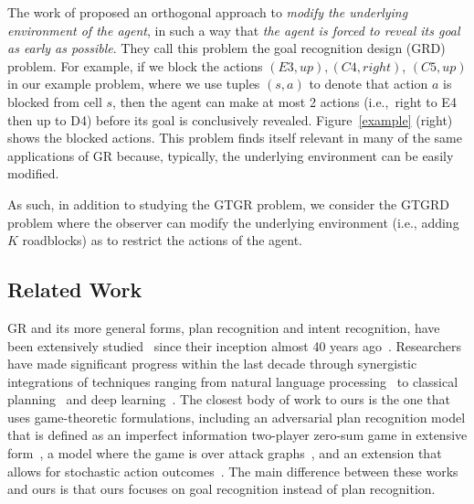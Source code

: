 The work of \cite{keren:14,keren:15} proposed an orthogonal 
approach to \emph{modify the underlying environment of the agent}, in such a way that 
\emph{the agent is forced to reveal its goal as early as possible}. 
They call this problem the goal recognition design (GRD) problem. 
For example, if we block the actions $(E3, up), (C4, right)$, $(C5, up)$ in our example problem, 
where we use tuples $(s,a)$ to denote that action $a$ is blocked from cell $s$, then the agent can 
make at most 2 actions (i.e.,~right to E4 then up to D4) before its goal is conclusively revealed. 
Figure~\ref{example} (right) shows the blocked actions. 
This problem finds itself relevant in many of the same 
applications of GR because, typically, the underlying environment can be easily modified. 

As such, in addition to studying the GTGR problem, we consider the GTGRD problem 
where the observer can modify the underlying environment (i.e., adding $K$ roadblocks)
as to restrict the actions of the agent. 

\subsection{Related Work}

GR and its more general forms, plan recognition and intent recognition, have been extensively studied~\cite{Sukthankar:14} since their inception almost 40 years ago~\cite{schmidt:78}. Researchers have made significant progress within the last decade through synergistic integrations of techniques ranging from natural language processing~\cite{vilain:90,geib:07} to classical planning~\cite{ramirez:09,ramirez:10,ramirez:11} and deep learning~\cite{min:14}. The closest body of work to ours is the one that uses game-theoretic formulations, including an adversarial plan recognition model that is defined as an imperfect information two-player zero-sum game in extensive form~\cite{lisy:12}, 
a model where the game is over attack graphs~\cite{braynov:06}, 
and an extension that allows for stochastic action outcomes~\cite{guillarme:15}. 
The main difference between these works and ours is that ours focuses on goal recognition instead of plan recognition. 


